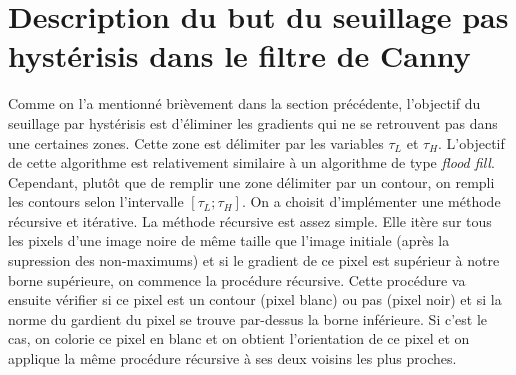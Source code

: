 \documentclass{article}
\begin{document}
\section{Description du but du seuillage pas hystérisis dans le filtre de Canny}
Comme on l'a mentionné brièvement dans la section précédente, l'objectif du seuillage par hystérisis est d'éliminer les gradients qui ne se
retrouvent pas dans une certaines zones. Cette zone est délimiter par les variables $\tau_L$ et $\tau_H$. L'objectif de cette algorithme est relativement 
similaire à un algorithme de type \textit{flood fill}. Cependant, plutôt que de remplir une zone délimiter par un contour, on rempli les contours selon
l'intervalle $[\tau_L; \tau_H]$. On a choisit d'implémenter une méthode récursive et itérative. La méthode récursive est assez simple. Elle itère sur tous
les pixels d'une image noire de même taille que l'image initiale (après la supression des non-maximums) et si le gradient de ce pixel est supérieur à notre borne
supérieure, on commence la procédure récursive. Cette procédure va ensuite vérifier si ce pixel est un contour (pixel blanc) ou pas (pixel noir) et si
la norme du gardient du pixel se trouve par-dessus la borne inférieure. Si c'est le cas, on colorie ce pixel en blanc et on obtient l'orientation 
de ce pixel et on applique la même procédure récursive à ses deux voisins les plus proches.
\end{document}
